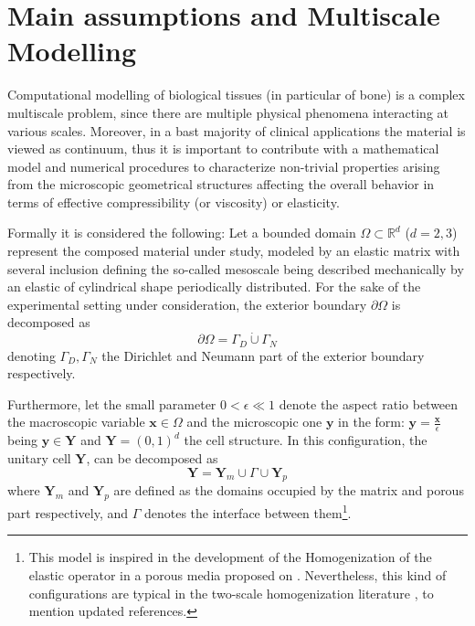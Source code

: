 \section{Main assumptions and Multiscale Modelling}

Computational modelling of biological tissues (in particular of bone) is a complex multiscale problem, since there are multiple physical phenomena interacting at various scales. Moreover, in a bast majority of clinical applications the material is viewed as continuum, thus it is important to contribute with a mathematical model and numerical procedures to characterize non-trivial properties arising from the microscopic geometrical structures affecting the overall behavior in terms of effective compressibility (or viscosity) or elasticity. 

Formally it is considered the following:
Let a bounded domain $\Omega \subset \mathbb{R}^d$ ($d = 2,3$) represent the composed material under study, modeled by an elastic matrix with several inclusion defining the so-called mesoscale being described mechanically by an elastic of cylindrical shape periodically distributed.
For the sake of the experimental setting under consideration, the exterior boundary $\partial \Omega$ is decomposed as
\begin{equation*}
	\partial \Omega = \Gamma_D \dot\cup \Gamma_N
\end{equation*}
denoting $\Gamma_D, \Gamma_N$ the Dirichlet and Neumann part of the exterior boundary respectively.

Furthermore, let the small parameter $0 < \epsilon \ll 1$ denote the aspect ratio between the macroscopic variable $\mathbf{x} \in \Omega$ and the microscopic one $\mathbf{y}$ in the form: $\mathbf{y} = \frac{\mathbf{x}}{\epsilon}$ being $\mathbf{y} \in \mathbf{Y}$ and $\mathbf{Y} = (0,1)^d$ the cell structure. In this configuration, the unitary cell $\mathbf{Y}$, can be decomposed as
\begin{equation*}
	\mathbf{Y} = \mathbf{Y}_m \cup \Gamma \cup \mathbf{Y}_p 
\end{equation*}
where $\mathbf{Y}_m$ and $\mathbf{Y}_p$ are defined as the domains occupied by the matrix and porous part respectively, and $\Gamma$ denotes the interface between them\footnote{This model is inspired in the development of the Homogenization of the elastic operator in a porous media proposed on \cite{christensen1982theory}. Nevertheless, this kind of configurations are typical in the two-scale homogenization literature \cite{panasenko2005multi-scale}, \cite{Boughammoura2013} to mention updated references.}.

